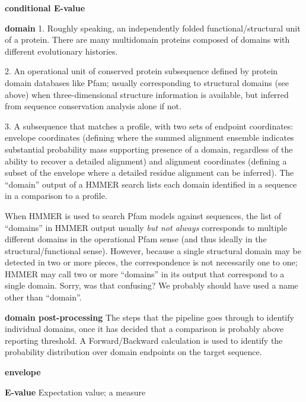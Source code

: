 \begin{wideitem}
\item[\textbf{conditional E-value}]


\item[\textbf{domain}]
  1. Roughly speaking, an independently folded functional/structural
  unit of a protein. There are many multidomain proteins composed of
  domains with different evolutionary histories. 

  2. An operational unit of conserved protein subsequence defined by
  protein domain databases like Pfam; usually corresponding to
  structural domains (see above) when three-dimensional structure
  information is available, but inferred from sequence conservation
  analysis alone if not.

  3. A subsequence that matches a profile, with two sets of endpoint
  coordinates: envelope coordinates (defining where the summed
  alignment ensemble indicates substantial probability mass supporting
  presence of a domain, regardless of the ability to recover a
  detailed alignment) and alignment coordinates (defining a subset of
  the envelope where a detailed residue alignment can be inferred).
  The ``domain'' output of a HMMER search lists each domain identified
  in a sequence in a comparison to a profile.
     
  When HMMER is used to search Pfam models against sequences, the list
  of ``domains'' in HMMER output usually \emph{but not always}
  corresponds to multiple different domains in the operational Pfam
  sense (and thus ideally in the structural/functional
  sense). However, because a single structural domain may be detected
  in two or more pieces, the correspondence is not necessarily one to
  one; HMMER may call two or more ``domains'' in its output that
  correspond to a single domain. Sorry, was that confusing? We
  probably should have used a name other than ``domain''.

\item[\textbf{domain post-processing}] The steps that the pipeline
  goes through to identify individual domains, once it has decided
  that a comparison is probably above reporting threshold. 
  A Forward/Backward calculation is used to identify the probability
  distribution over domain endpoints on the target sequence.


\item[\textbf{envelope}]



\item[\textbf{E-value}]
  Expectation value; a measure 


\end{wideitem}
